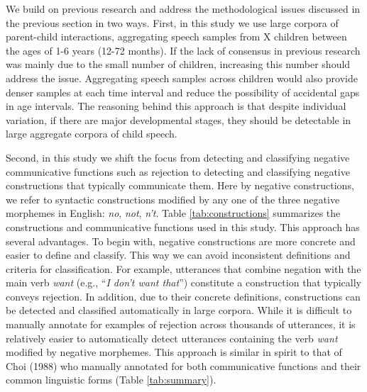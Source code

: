\documentclass[
  english,
  man,floatsintext]{apa6}
\begin{document}
We build on previous research and address the methodological issues discussed in the previous section in two ways. First, in this study we use large corpora of parent-child interactions, aggregating speech samples from X children between the ages of 1-6 years (12-72 months). If the lack of consensus in previous research was mainly due to the small number of children, increasing this number should address the issue. Aggregating speech samples across children would also provide denser samples at each time interval and reduce the possibility of accidental gaps in age intervals. The reasoning behind this approach is that despite individual variation, if there are major developmental stages, they should be detectable in large aggregate corpora of child speech.

Second, in this study we shift the focus from detecting and classifying negative communicative functions such as rejection to detecting and classifying negative constructions that typically communicate them. Here by negative constructions, we refer to syntactic constructions modified by any one of the three negative morphemes in English: \emph{no}, \emph{not}, \emph{n't}. Table \ref{tab:constructions} summarizes the constructions and communicative functions used in this study. This approach has several advantages. To begin with, negative constructions are more concrete and easier to define and classify. This way we can avoid inconsistent definitions and criteria for classification. For example, utterances that combine negation with the main verb \emph{want} (e.g., ``\emph{I don't want that}'') constitute a construction that typically conveys rejection. In addition, due to their concrete definitions, constructions can be detected and classified automatically in large corpora. While it is difficult to manually annotate for examples of rejection across thousands of utterances, it is relatively easier to automatically detect utterances containing the verb \emph{want} modified by negative morphemes. This approach is similar in spirit to that of Choi (1988) who manually annotated for both communicative functions and their common linguistic forms (Table \ref{tab:summary}).
\end{document}
